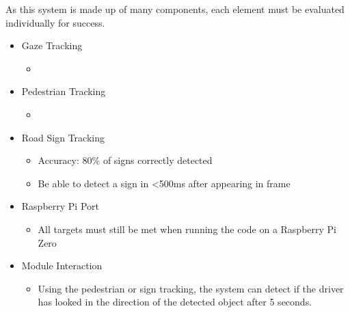 As this system is made up of many components, each element must be evaluated individually for success.
\begin{itemize}
    \item Gaze Tracking
        \begin{itemize}
            \item 
        \end{itemize}
    \item Pedestrian Tracking
        \begin{itemize}
            \item 
        \end{itemize}
    \item Road Sign Tracking
        \begin{itemize}
            \item Accuracy: 80\% of signs correctly detected
            \item Be able to detect a sign in <500ms after appearing in frame
        \end{itemize}
    \item Raspberry Pi Port
        \begin{itemize}
            \item All targets must still be met when running the code on a Raspberry Pi Zero
        \end{itemize}
    \item Module Interaction
        \begin{itemize}
            \item Using the pedestrian or sign tracking, the system can detect if the driver has looked in the direction of the detected object after 5 seconds.
        \end{itemize}
\end{itemize}
